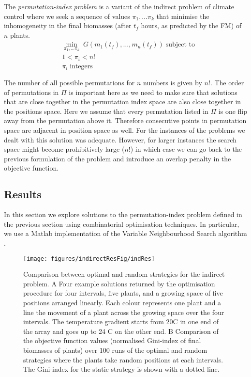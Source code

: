 \begin{definition}
The \emph{permutation-index problem} is a variant of the indirect problem of
climate control where we seek a sequence of values $\pi_1, \dots \pi_k$ that minimise the
inhomogeneity in the final biomasses (after $t_f$ hours, as predicted by the FM)
of $n$ plants.
\begin{align*}
& \min_{\pi_1, \dots \pi_k} \; G(m_1(t_f), \dots, m_n(t_f)) \; \text{subject to} \\
& 1 < \pi_i < n! \\
& \pi_i \; \text{integers}
\end{align*}
\end{definition}

The number of all possible permutations for $n$ numbers is given by $n!$. The
order of permutations in $\Pi$ is important here as we need to make sure that
solutions that are close together in the permutation index space are also close
together in the positions space. Here we assume that every permutation listed in
$\Pi$ is one flip away from the permutation above it. Therefore consecutive
points in permutation space are adjacent in position space as well. For the
instances of the problems we dealt with this solution was adequate. However, for
larger instances the search space might become prohibitively large ($n!$) in
which case we can go back to the previous formulation of the problem and
introduce an overlap penalty in the objective function.

\subsection{Results} 
In this section we explore solutions to the permutation-index problem defined in
the previous section using combinatorial optimisation techniques. In particular,
we use a Matlab implementation \citep[MEIGO too;][]{banga2014} of the Variable
Neighbourhood Search algorithm \citep[VNS;][]{mladenovic1997variable}.

\begin{figure}[tb]
\centering
\texttt{[image: figures/indirectResFig/indRes]}
\caption{
  Comparison between optimal and random strategies for the indirect problem. A
Four example solutions returned by the optimisation procedure for four
intervals, five plants, and a growing space of five positions arranged
linearly. Each colour represents one plant and a line the movement of a plant
across the growing space over the four intervals. The temperature gradient
starts from 20\textdegree C in one end of the array and goes up to 24\textdegree
C on the other end. B Comparison of the objective function values (normalised
Gini-index of final biomasses of plants) over 100 runs of the optimal and random
strategies where the plants take random positions at each intervals. The
Gini-index for the static strategy is shown with a dotted line.
}
\label{fig:compsAllInDir}
\end{figure}

